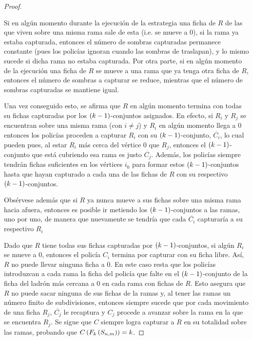 \begin{proof}
\begin{enumerate}
            Si en alg\'un momento durante la ejecuci\'on de la estrategia una
            ficha de $R$ de las que viven sobre una misma rama sale de esta
            (i.e. se mueve a $0$), si la rama ya estaba capturada, entonces el
            n\'umero de sombras capturadas permanece constante (pues los
            polic\'ias ignoran cuando las sombras de traslapan), y lo mismo
            sucede si dicha rama no estaba capturada. Por otra parte, si en
            alg\'un momento de la ejecuci\'on una ficha de $R$ se mueve a una
            rama que ya tenga otra ficha de $R$, entonces el n\'umero de sombras
            a capturar se reduce, mientras que el n\'umero de sombras capturadas
            se mantiene igual.

            Una vez conseguido esto, se afirma que $R$ en alg\'un momento
            termina con todas su fichas capturadas por los $\left( k-1\right)$-conjuntos
            asignados. En efecto, si $R_i$ y $R_j$ se encuentran sobre una misma
            rama (con $i\neq j$) y $R_i$ en alg\'un momento llega a $0$ entonces
            los polic\'ias proceden a capturar $R_i$ con su $\left( k-1\right)$-conjunto,
            $\overline{C_i}$, lo cual pueden pues, al estar $R_i$ m\'as cerca
            del v\'ertice $0$ que $R_j$, entonces el $\left( k-1\right)$-conjunto que
            est\'a cubriendo esa rama es justo $\overline{C_j}$. Adem\'as, los
            polic\'ias siempre tendr\'an fichas suficientes en los v\'ertices
            $i_0$ para formar estos $\left( k-1\right)$-conjuntos hasta que hayan
            capturado a cada una de las fichas de $R$ con su respectivo
            $\left( k-1\right)$-conjuntos.
            
            Obs\'ervese adem\'as que si $R$ ya nunca mueve a sus fichas sobre
            una misma rama hacia afuera, entonces es posible ir metiendo los
            $\left( k-1\right)$-conjuntos a las ramas, uno por uno, de manera que
            nuevamente se tendr\'ia que cada $\overline{C_i}$ capturar\'ia a su
            respectivo $R_i$
        \end{enumerate}

        Dado que $R$ tiene todas sus fichas capturadas por $\left( k-1\right)$-conjuntos,
        si alg\'un $R_i$ se mueve a $0$, entonces el polic\'ia $C_i$ termina por
        capturar con su ficha libre. As\'i, $R$ no puede llevar ninguna ficha a
        $0$. En este caso resta que los polic\'ias introduzcan a cada rama la
        ficha del polic\'ia que falte en el $\left( k-1\right)$-conjunto de la ficha del
        ladr\'on m\'as cercana a $0$ en cada rama con fichas de $R$. Esto
        asegura que $R$ no puede sacar ninguna de sus fichas de la ramas y, al
        tener las ramas un n\'umero finito de subdivisiones, entonces siempre
        sucede que por cada movimiento de una ficha $R_j$, $\overline{C_j}$ le
        recaptura y $C_j$ procede a avanzar sobre la rama en la que se encuentra
        $R_j$. Se sigue que $C$ siempre logra capturar a $R$ en su totalidad
        sobre las ramas, probando que $C\left( F_k\left( S_{n,m}\right)\right)=k$.
        
        \end{proof}
